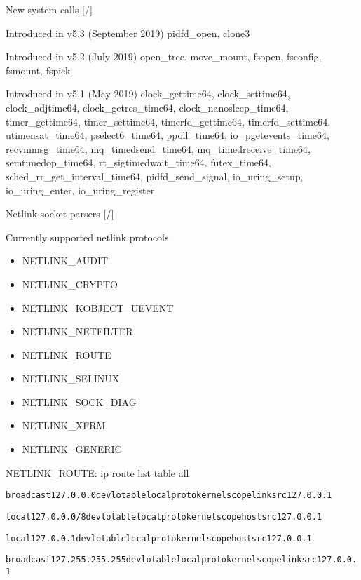 \documentclass[unicode,aspectratio=169,xcolor={table,dvipsnames,usernames}]{beamer}
\begin{document}
\begin{frame}{New system calls \hfill [\insertframenumber/\inserttotalframenumber]}
\begin{block}{\Large Introduced in v5.3 (September 2019)}
pidfd\_open, clone3
\end{block}

\begin{block}{\Large Introduced in v5.2 (July 2019)}
open\_tree, move\_mount, fsopen, fsconfig, fsmount, fspick
\end{block}

\begin{block}{\Large Introduced in v5.1 (May 2019)}
clock\_gettime64,
clock\_settime64,
clock\_adjtime64,
clock\_getres\_time64,
clock\_nanosleep\_time64,
timer\_gettime64,
timer\_settime64,
timerfd\_gettime64,
timerfd\_settime64,
utimensat\_time64,
pselect6\_time64,
ppoll\_time64,
io\_pgetevents\_time64,
recvmmsg\_time64,
mq\_timedsend\_time64,
mq\_timedreceive\_time64,
semtimedop\_time64,
rt\_sigtimedwait\_time64,
futex\_time64,
sched\_rr\_get\_interval\_time64,
pidfd\_send\_signal,
io\_uring\_setup,
io\_uring\_enter,
io\_uring\_register
\end{block}
\end{frame}

\begin{frame}{Netlink socket parsers \hfill [\insertframenumber/\inserttotalframenumber]}
\tiny
\begin{block}{\large Currently supported netlink protocols}
\begin{itemize}
\item NETLINK\_AUDIT
\item NETLINK\_CRYPTO
\item NETLINK\_KOBJECT\_UEVENT
\item NETLINK\_NETFILTER
\item NETLINK\_ROUTE
\item NETLINK\_SELINUX
\item NETLINK\_SOCK\_DIAG
\item NETLINK\_XFRM
\item NETLINK\_GENERIC
\end{itemize}
\end{block}

\begin{block}{\large NETLINK\_ROUTE: ip route list table all}
\begin{alltt}
broadcast 127.0.0.0 dev lo table local proto kernel scope link src 127.0.0.1

local 127.0.0.0/8 dev lo table local proto kernel scope host src 127.0.0.1

local 127.0.0.1 dev lo table local proto kernel scope host src 127.0.0.1

broadcast 127.255.255.255 dev lo table local proto kernel scope link src 127.0.0.1
\end{alltt}
\end{block}
\end{frame}
\end{document}
